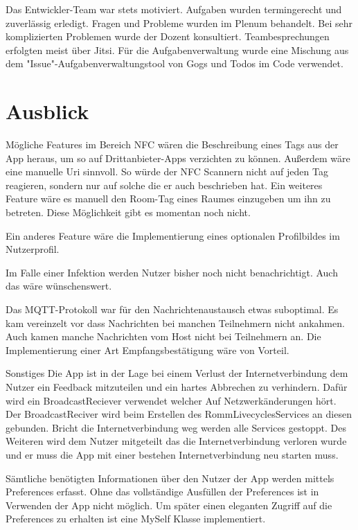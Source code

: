 Das Entwickler-Team war stets motiviert. Aufgaben wurden termingerecht und zuverlässig erledigt.
Fragen und Probleme wurden im Plenum behandelt.
Bei sehr komplizierten Problemen wurde der Dozent konsultiert.
Teambesprechungen erfolgten meist über Jitsi.
Für die Aufgabenverwaltung wurde eine Mischung aus dem "Issue"-Aufgabenverwaltungstool von Gogs und Todos im Code verwendet.
\section{Ausblick}
\label{sec:Ausblick}
Mögliche Features im Bereich NFC wären die Beschreibung eines Tags aus der App heraus, um so auf Drittanbieter-Apps verzichten zu können. 
Außerdem wäre eine manuelle Uri sinnvoll. So würde der NFC Scannern nicht auf jeden Tag reagieren, sondern nur auf solche die er auch beschrieben hat. 
Ein weiteres Feature wäre es manuell den Room-Tag eines Raumes einzugeben um ihn zu betreten. Diese Möglichkeit gibt es momentan noch nicht.

Ein anderes Feature wäre die Implementierung eines optionalen Profilbildes im Nutzerprofil.

Im Falle einer Infektion werden Nutzer bisher noch nicht benachrichtigt. Auch das wäre wünschenswert.

Das MQTT-Protokoll war für den Nachrichtenaustausch etwas suboptimal. Es kam vereinzelt vor dass Nachrichten bei manchen Teilnehmern nicht ankahmen. Auch kamen manche Nachrichten vom Host nicht bei Teilnehmern an. Die Implementierung einer Art Empfangsbestätigung wäre von Vorteil.

Sonstiges
Die App ist in der Lage bei einem Verlust der Internetverbindung dem Nutzer ein Feedback mitzuteilen und ein hartes Abbrechen zu verhindern. Dafür wird ein BroadcastReciever verwendet welcher Auf Netzwerkänderungen hört. Der BroadcastReciver wird beim Erstellen des RommLivecyclesServices an diesen gebunden. Bricht die Internetverbindung weg werden alle Services gestoppt. Des Weiteren wird dem Nutzer mitgeteilt das die Internetverbindung verloren wurde und er muss die App mit einer bestehen Internetverbindung neu starten muss.

Sämtliche benötigten Informationen über den Nutzer der App werden mittels Preferences erfasst. Ohne das vollständige Ausfüllen der Preferences ist in Verwenden der App nicht möglich. Um später einen eleganten Zugriff auf die Preferences zu erhalten ist eine MySelf Klasse implementiert.

